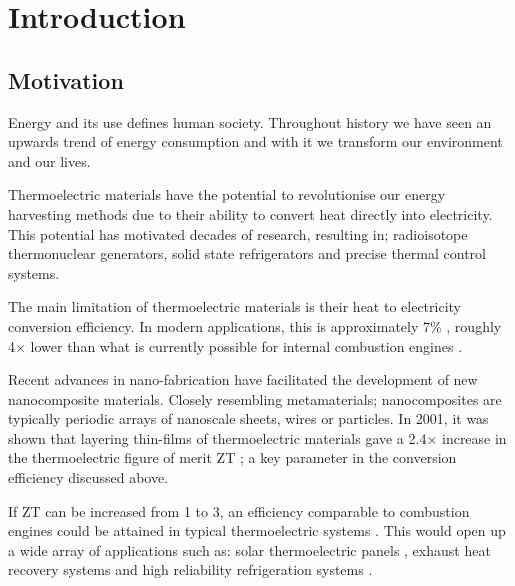 \documentclass[12pt]{article}
\begin{document}
\pagebreak

\tableofcontents

\pagebreak


\pagestyle{fancy}

\section{Introduction}
 
\subsection{Motivation}
Energy and its use defines human society. Throughout history we have seen an upwards trend of energy consumption and with it we transform our environment and our lives.

Thermoelectric materials have the potential to revolutionise our energy harvesting methods due to their ability to convert heat directly into electricity. This potential has motivated decades of research, resulting in; radioisotope thermonuclear generators, solid state refrigerators and precise thermal control systems.

The main limitation of thermoelectric materials is their heat to electricity conversion efficiency. In modern applications, this is approximately 7\% \cite{modern-thermoelectrics}, roughly 4$\times$ lower than what is currently possible for internal combustion engines \cite{engine-efficiency}.

Recent advances in nano-fabrication have facilitated the development of new nanocomposite materials. Closely resembling metamaterials; nanocomposites are typically periodic arrays of nanoscale sheets, wires or particles. In 2001, it was shown that layering thin-films of thermoelectric materials gave a 2.4$\times$ increase in the thermoelectric figure of merit ZT \cite{nanocomposite-zt}; a key parameter in the conversion efficiency discussed above.

If ZT can be increased from 1 to 3, an efficiency comparable to combustion engines could be attained in typical thermoelectric systems \cite{liu-review}. This would open up a wide array of applications such as: solar thermoelectric panels \cite{solar-thermal}, exhaust heat recovery systems \cite{exhust-recovery} and high reliability refrigeration systems \cite{thermo-cooling}.
\end{document}
